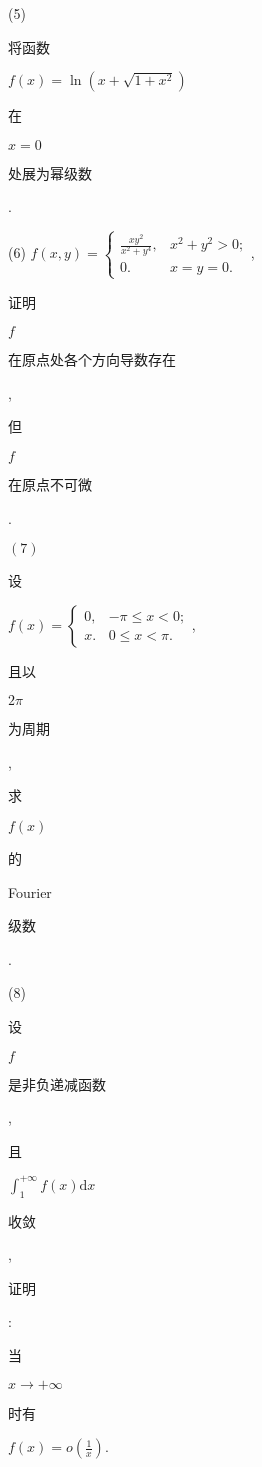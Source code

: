 \documentclass[10pt]{article}
\begin{document}
(5) \begin{CJK}{UTF8}{mj}将函数\end{CJK} $f(x)=\ln \left(x+\sqrt{1+x^{2}}\right)$ \begin{CJK}{UTF8}{mj}在\end{CJK} $x=0$ \begin{CJK}{UTF8}{mj}处展为幂级数\end{CJK}.

(6) $f(x, y)=\left\{\begin{array}{ll}\frac{x y^{2}}{x^{2}+y^{4}}, & x^{2}+y^{2}>0 ; \\ 0 . & x=y=0 .\end{array}\right.$, \begin{CJK}{UTF8}{mj}证明\end{CJK} $f$ \begin{CJK}{UTF8}{mj}在原点处各个方向导数存在\end{CJK}, \begin{CJK}{UTF8}{mj}但\end{CJK} $f$ \begin{CJK}{UTF8}{mj}在原点不可微\end{CJK}.

$(7)$ \begin{CJK}{UTF8}{mj}设\end{CJK} $f(x)=\left\{\begin{array}{ll}0, & -\pi \leqslant x<0 ; \\ x . & 0 \leqslant x<\pi .\end{array}\right.$, \begin{CJK}{UTF8}{mj}且以\end{CJK} $2 \pi$ \begin{CJK}{UTF8}{mj}为周期\end{CJK}, \begin{CJK}{UTF8}{mj}求\end{CJK} $f(x)$ \begin{CJK}{UTF8}{mj}的\end{CJK} Fourier \begin{CJK}{UTF8}{mj}级数\end{CJK}.

(8) \begin{CJK}{UTF8}{mj}设\end{CJK} $f$ \begin{CJK}{UTF8}{mj}是非负递减函数\end{CJK}, \begin{CJK}{UTF8}{mj}且\end{CJK} $\int_{1}^{+\infty} f(x) \mathrm{d} x$ \begin{CJK}{UTF8}{mj}收敛\end{CJK}, \begin{CJK}{UTF8}{mj}证明\end{CJK}: \begin{CJK}{UTF8}{mj}当\end{CJK} $x \rightarrow+\infty$ \begin{CJK}{UTF8}{mj}时有\end{CJK} $f(x)=o\left(\frac{1}{x}\right)$.
\end{document}
